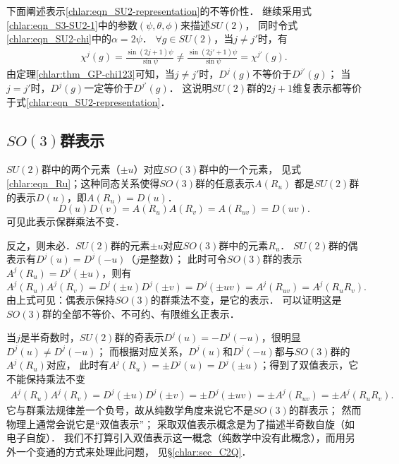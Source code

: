 下面阐述表示\eqref{chlar:eqn_SU2-representation}的不等价性．
继续采用式\eqref{chlar:eqn_S3-SU2-1}中的参数$(\psi,\theta,\phi)$来描述$SU(2)$，
同时令式\eqref{chlar:eqn_SU2-chi}中的$\alpha=2\psi$．
$\forall g \in SU(2)$，当$j\neq j'$时，有
\begin{align*}
	\chi^j(g)= \frac{\sin(2j+1)\psi}{\sin \psi}
	\neq \frac{\sin(2j'+1)\psi}{\sin \psi} = \chi^{j'}(g).
\end{align*}
由定理\ref{chlar:thm_GP-chi123}可知，当$j\neq j'$时，$D^j(g)$不等价于$D^{j'}(g)$；
当$j= j'$时，$D^j(g)$一定等价于$D^{j'}(g)$．
这说明$SU(2)$群的$2j+1$维复表示都等价于式\eqref{chlar:eqn_SU2-representation}．






\subsection{$SO(3)$群表示}
$SU(2)$群中的两个元素（$\pm u$）对应$SO(3)$群中的一个元素，
见式\eqref{chlar:eqn_Ru}；这种同态关系使得$SO(3)$群的任意表示$A(R_u)$
都是$SU(2)$群的表示$D(u)$，即$A(R_u)=D(u)$．
\begin{equation}
    D(u)D(v)=A(R_u) A(R_v) = A(R_{uv}) = D(uv) .
\end{equation}
可见此表示保群乘法不变．

反之，则未必．$SU(2)$群的元素$\pm u$对应$SO(3)$群中的元素$R_u$．
$SU(2)$群的偶表示有$D^j(u)=D^j(-u)$（$j$是整数）；
此时可令$SO(3)$群的表示$A^j(R_u)= D^j(\pm u)$，则有
\begin{equation*}
    A^j(R_u) A^j(R_v) =D^j(\pm u)D^j(\pm v)=D^j(\pm uv) = A^j(R_{uv}) =A^j(R_{u}R_{v}) .
\end{equation*}
由上式可见：偶表示保持$SO(3)$的群乘法不变，是它的表示．
可以证明\cite[\S 6.6.4]{qiuws-2011}这是$SO(3)$群的全部不等价、不可约、有限维幺正表示．

当$j$是半奇数时，$SU(2)$群的奇表示$D^j(u)=-D^j(-u)$，很明显$D^j(u)\neq D^j(-u)$；
而根据对应关系，$D^j(u)$和$ D^j(-u)$都与$SO(3)$群的$A^j(R_u)$对应，
此时有$A^j(R_u)=\pm D^j(u)=D^j(\pm u)$；得到了{\kaishu 双值表示}，它不能保持乘法不变
\begin{align*}
    A^j(R_u) A^j(R_v) =D^j(\pm u)D^j(\pm v)=\pm D^j(\pm uv) = \pm  A^j(R_{uv})=\pm A^j(R_{u}R_{v}) .
\end{align*}
它与群乘法规律差一个负号，故从纯数学角度来说它不是$SO(3)$的群表示；
然而物理上通常会说它是“双值表示”；
采取双值表示概念是为了描述半奇数自旋（如电子自旋）．
我们不打算引入双值表示这一概念（纯数学中没有此概念），而用另外一个变通的方式来处理此问题，
见\S\ref{chlar:sec_C2Q}．


